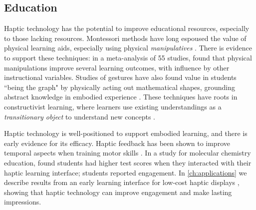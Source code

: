 \subsection{Education}
Haptic technology has the potential to improve educational resources, especially to those lacking resources.
Montessori methods have long espoused the value of physical learning aids, especially using physical \emph{manipulatives} \cite{Montessori1917}.
There is evidence to support these techniques: in a meta-analysis of 55 studies, \citet{Carbonneau2013} found that physical manipulations improve several learning outcomes, with influence by other instructional variables.
Studies of gestures have also found value in students ``being the graph" by physically acting out mathematical shapes, grounding abstract knowledge in embodied experience \cite{Gerofsky2010}.
These techniques have roots in constructivist learning, where learners use existing understandings as a \emph{transitionary object} to understand new concepts \cite{Papert1980}.

Haptic technology is well-positioned to support embodied learning, and there is early evidence for its efficacy.
Haptic feedback has been shown to improve temporal aspects when training motor skills \cite{Feygin2002}.
In a study for molecular chemistry education, \citet{Sato2008} found students had higher test scores when they interacted with their haptic learning interface; students reported engagement.
In \autoref{ch:applications} we describe results from an early learning interface for low-cost haptic displays \cite{Martinez2016}, showing that haptic technology can improve engagement and make lasting impressions.


